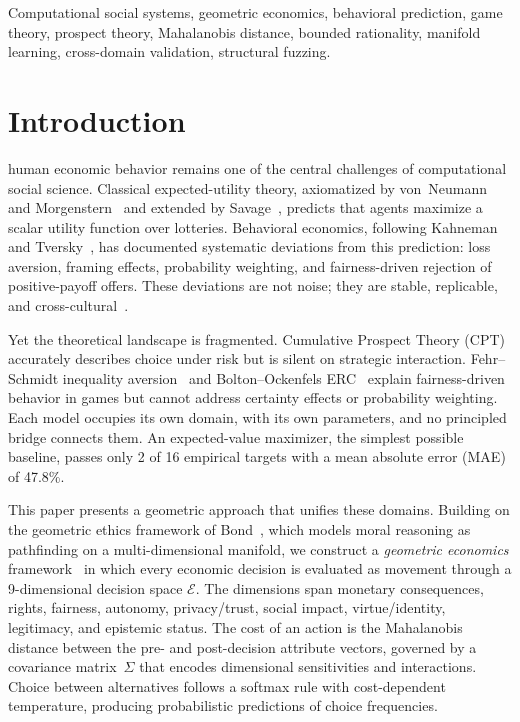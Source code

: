 \documentclass[journal]{IEEEtran}
\newcommand{\E}{\mathcal{E}}               %
\begin{document}
\begin{IEEEkeywords}
Computational social systems, geometric economics, behavioral prediction, game theory, prospect theory, Mahalanobis distance, bounded rationality, manifold learning, cross-domain validation, structural fuzzing.
\end{IEEEkeywords}


\section{Introduction}
\label{sec:intro}

 human economic behavior remains one of the central challenges of computational social science.
Classical expected-utility theory, axiomatized by von~Neumann and Morgenstern~\cite{vonneumann1944} and extended by Savage~\cite{savage1954}, predicts that agents maximize a scalar utility function over lotteries.
Behavioral economics, following Kahneman and Tversky~\cite{kahneman1979}, has documented systematic deviations from this prediction: loss aversion, framing effects, probability weighting, and fairness-driven rejection of positive-payoff offers.
These deviations are not noise; they are stable, replicable, and cross-cultural~\cite{ruggeri2020,henrich2010}.

Yet the theoretical landscape is fragmented.
Cumulative Prospect Theory (CPT)~\cite{tversky1992} accurately describes choice under risk but is silent on strategic interaction.
Fehr--Schmidt inequality aversion~\cite{fehr1999} and Bolton--Ockenfels ERC~\cite{bolton2000} explain fairness-driven behavior in games but cannot address certainty effects or probability weighting.
Each model occupies its own domain, with its own parameters, and no principled bridge connects them.
An expected-value maximizer, the simplest possible baseline, passes only 2 of 16 empirical targets with a mean absolute error (MAE) of 47.8\%.

This paper presents a geometric approach that unifies these domains.
Building on the geometric ethics framework of Bond~\cite{bond2026geometric}, which models moral reasoning as pathfinding on a multi-dimensional manifold, we construct a \emph{geometric economics} framework~\cite{bond2026GE} in which every economic decision is evaluated as movement through a 9-dimensional decision space $\E$.
The dimensions span monetary consequences, rights, fairness, autonomy, privacy/trust, social impact, virtue/identity, legitimacy, and epistemic status.
The cost of an action is the Mahalanobis distance between the pre- and post-decision attribute vectors, governed by a covariance matrix~$\Sigma$ that encodes dimensional sensitivities and interactions.
Choice between alternatives follows a softmax rule with cost-dependent temperature, producing probabilistic predictions of choice frequencies.
\end{document}
